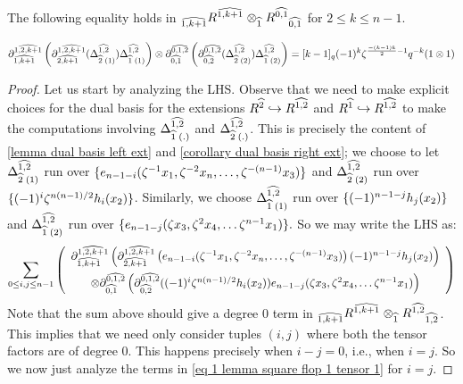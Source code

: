\begin{lemma}\label{lemma square flop 1 tensor 1}
    The following equality holds in $\Bimod{\hh{1,k+1}}{}{R^{\hh{1,k+1}}}\otimes_{\hh{1}}\Bimod{}{\hh{0,1}}{R^{\hh{0,1}}}$ for $2\leq k\leq n-1$.
    
    $$\ddm{1,2, k+1}{1,k+1}\left(\ddm{1,2,k+1}{2,k+1}(\Del{1,2}{2}{1})\Del{1,2}{1}{1}\right) \otimes \ddm{0,1,2}{0,1}\left(\ddm{0,1,2}{0,2}(\Del{1,2}{2}{2})\Del{1,2}{1}{2} \right) =[k-1]_q(-1)^k\zeta^{\frac{-(k-1)k}{2} -1}q^{-k}(1\otimes 1)$$
\end{lemma}
\begin{proof}
    Let us start by analyzing the LHS. 
    Observe that we need to make explicit choices for the dual basis for the extensions $R^{\hh{2}}\hookrightarrow R^{\hh{1,2}}$ and $R^{\hh{1}}\hookrightarrow R^{\hh{1,2}}$ to make the computations involving $\Del{1,2}{1}{.}$ and $\Del{1,2}{2}{.}$. 
    This is precisely the content of \cref{lemma dual basis left ext} and \cref{corollary dual basis right ext}; we choose to let $\Del{1,2}{2}{1}$ run over $\set{e_{n-1-i}(\zeta^{-1}x_1, \zeta^{-2}x_n, \ldots , \zeta^{-(n-1)}x_3)}$ and $\Del{1,2}{2}{2}$ run over $ \set{(-1)^i\zeta^{n(n-1)/2}h_i(x_2)}$.
    Similarly, we choose $\Del{1,2}{1}{1}$ run over $\set{(-1)^{n-1-j}h_{j}(x_2)}$ and $\Del{1,2}{1}{2}$ run over $\set{e_{n-1-j}(\zeta x_3, \zeta^2 x_4, \ldots \zeta^{n-1} x_1)}.$
    So we may write the LHS as:
    \begin{align}
    \sum_{0\leq i,j \leq n-1} \left( \begin{array}{c}
    \ddm{1,2, k+1}{1,k+1}\left(\ddm{1,2,k+1}{2,k+1}\left(e_{n-1-i}(\zeta^{-1}x_1, \zeta^{-2}x_n, \ldots , \zeta^{-(n-1)}x_3)\right)(-1)^{n-1-j}h_{j}(x_2)\right) \vspace{5 pt}\\ \otimes \ddm{0,1,2}{0,1}\left(\ddm{0,1,2}{0,2}((-1)^i\zeta^{n(n-1)/2}h_i(x_2))e_{n-1-j}(\zeta x_3, \zeta^2 x_4, \ldots \zeta^{n-1} x_1) \right) \label{eq 1 lemma square flop 1 tensor 1}
    \end{array}\right)
    \end{align}
    Note that the sum above should give a degree 0 term in $\Bimod{\hh{1,k+1}}{}{R^{\hh{1,k+1}}}\otimes_{\hh{1}}\Bimod{}{\hh{1,2}}{R^{\hh{1,2}}}$. This implies that we need only consider tuples $(i,j)$ where both the tensor factors are of degree $0$.
    This happens precisely when $i-j=0$, i.e., when $i=j$.
    So we now just analyze the terms in \eqref{eq 1 lemma square flop 1 tensor 1} for $i=j.$
    

\end{proof}
